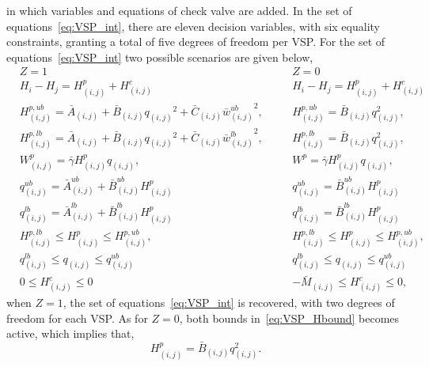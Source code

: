 in which variables and equations of check valve are added. In the set of equations~\eqref{eq:VSP_int}, there are eleven decision variables, with six equality constraints, granting a total of five degrees of freedom per VSP\@. For the set of equations~\eqref{eq:VSP_int} two possible scenarios are given below,
\begin{subequations}
    \begin{alignat}{2}
        &Z = 1 && Z = 0
        \\
        & H_i - H_j = H^p_{(i,j)} + H^c_{(i,j)} && H_i - H_j = H^p_{(i,j)} + H^c_{(i,j)}
        \\
        &H^{p,ub}_{(i,j)} = \bar{A}_{(i,j)} + \bar{B}_{(i,j)} {q_{(i,j)}}^2 + \bar{C}_{(i,j)} {\bar{w}^{ub}_{(i,j)}}^{2}, \quad && H^{p,ub}_{(i,j)} = \bar{B}_{(i,j)} q_{(i,j)}^2, \label{eq:VSP_Hgub}
        \\
        &H^{p,lb}_{(i,j)} = \bar{A}_{(i,j)} + \bar{B}_{(i,j)} {q_{(i,j)}}^2 + \bar{C}_{(i,j)} {\bar{w}^{lb}_{(i,j)}}^{2}, \quad && H^{p,lb}_{(i,j)} = \bar{B}_{(i,j)} q_{(i,j)}^2, \label{eq:VSP_Hglb}
        \\
        & W^p_{(i,j)} = \bar{\gamma} H^p_{(i,j)} q_{(i,j)}, && W^p = \bar{\gamma} H^p_{(i,j)} q_{(i,j)},
        \\
        &  q^{ub}_{(i,j)} = \bar{A}^{ub}_{(i,j)} + \bar{B}^{ub}_{(i,j)} H^p_{(i,j)} && q^{ub}_{(i,j)} = \bar{B}^{ub}_{(i,j)} H^p_{(i,j)}
        \\
        &  q^{lb}_{(i,j)} = \bar{A}^{lb}_{(i,j)} + \bar{B}^{lb}_{(i,j)} H^p_{(i,j)} && q^{lb}_{(i,j)} = \bar{B}^{lb}_{(i,j)} H^p_{(i,j)}
        \\
        & H^{p,lb}_{(i,j)} \leq H^p_{(i,j)} \leq H^{p,ub}_{(i,j)}, && H^{p,lb}_{(i,j)} \leq H^p_{(i,j)} \leq H^{p,ub}_{(i,j)}, \label{eq:VSP_Hbound}
        \\
        & q^{lb}_{(i,j)} \leq q_{(i,j)} \leq q^{ub}_{(i,j)}&& q^{lb}_{(i,j)} \leq q_{(i,j)} \leq q^{ub}_{(i,j)} \label{eq:VSP_qbound}
        \\
        & 0 \leq H^c_{(i,j)} \leq 0 && -\bar M_{(i,j)} \leq H^c_{(i,j)} \leq 0,
    \end{alignat}
\end{subequations}
when $Z=1$, the set of equations~\eqref{eq:VSP_int} is recovered, with two degrees of freedom for each VSP\@. As for $Z=0$, both bounds in~\eqref{eq:VSP_Hbound} becomes active, which implies that,
\begin{equation}
    H^p_{(i,j)} = \bar{B}_{(i,j)} q_{(i,j)}^2.
\end{equation} 
